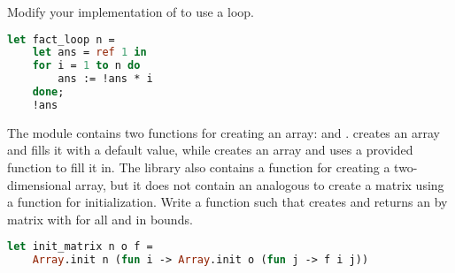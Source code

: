 Modify your implementation of  to use a loop.

\begin{lstlisting}[language=OCaml]
let fact_loop n =
	let ans = ref 1 in
	for i = 1 to n do
		ans := !ans * i
	done;
	!ans
\end{lstlisting}

The  module contains two functions for creating an array:  and .  creates an array and fills it with a default value, while  creates an array and uses a provided function to fill it in. The library also contains a function  for creating a two-dimensional array, but it does not contain an analogous  to create a matrix using a function for initialization.
Write a function  such that  creates and returns an  by  matrix  with  for all  and  in bounds.

\begin{lstlisting}[language=OCaml]
let init_matrix n o f =
	Array.init n (fun i -> Array.init o (fun j -> f i j))
\end{lstlisting}

